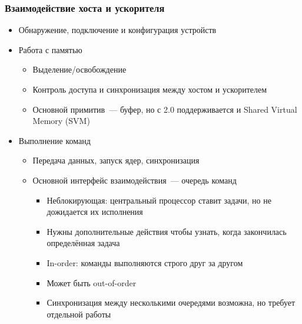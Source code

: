 \documentclass[
    aspectratio=169,
]{beamer}
\begin{document}
\begin{frame}
    \frametitle{Взаимодействие хоста и ускорителя}

    \begin{itemize}
        \item Обнаружение, подключение и конфигурация устройств
        \item Работа с памятью
              \begin{itemize}
                  \item Выделение/освобождение
                  \item Контроль доступа и синхронизация между хостом и ускорителем
                  \item Основной примитив~--- буфер, но с 2.0 поддерживается и Shared Virtual Memory (SVM)
              \end{itemize}
        \item Выполнение команд
              \begin{itemize}
                  \item Передача данных, запуск ядер, синхронизация
                  \item Основной интерфейс взаимодействия~--- очередь команд
                        \begin{itemize}
                            \item Неблокирующая: центральный процессор ставит задачи, но не дожидается их исполнения
                            \item Нужны дополнительные действия чтобы узнать, когда закончилась определённая задача
                            \item In-order: команды выполняются строго друг за другом
                            \item Может быть out-of-order
                            \item Синхронизация между несколькими очередями возможна, но требует отдельной работы
                        \end{itemize}
              \end{itemize}
    \end{itemize}

\end{frame}
\end{document}
